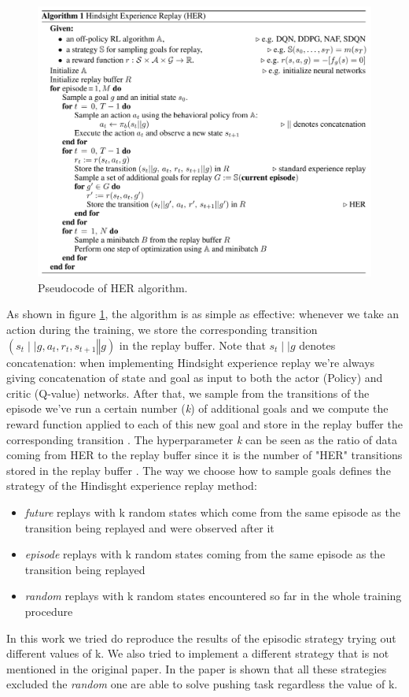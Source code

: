 \documentclass[a4paper]{report}
\begin{document}
\begin{figure}[h!]
\centering
\includegraphics[scale=0.5]{her.png}
\caption{\label{Fig: her} Pseudocode of HER algorithm.}
\end{figure}
As shown in figure \ref{Fig: her}, the algorithm is as simple as effective: whenever we take an action during the training, we store the corresponding transition $(s_t \mid\mid g , a_t, r_t, s_{t+1}\mathbin\Vert g)$ in the replay buffer. Note that $s_t \mid \mid g$ denotes concatenation: when implementing Hindsight experience replay we're always giving concatenation of state and goal as input to both the actor (Policy) and critic (Q-value) networks. 
 After that, we sample from the transitions of the episode we've run a certain number (\textit{k}) of additional goals and we compute the reward function applied to each of this new goal and store in the replay buffer the corresponding transition . The hyperparameter \textit{k} can be seen as the ratio of data coming from HER to the replay buffer since it is the number of "HER" transitions stored in the replay buffer . The way we choose how to sample goals defines the strategy of the Hindisght experience replay method:
\begin{itemize}
\item \textit{future}  replays with k random states which come from the same episode as the transition being replayed and were observed after it
\item \textit{episode}  replays with k random states coming from the same episode as the transition being replayed
\item \textit{random}  replays with k random states encountered so far in the whole training procedure
\end{itemize}
In this work we tried do reproduce the results of the episodic strategy trying out different values of k. We also tried to implement a different strategy that is not mentioned in the original paper. In the paper is shown that all these strategies excluded the \textit{random} one are able to solve pushing task regardless the value of k.
\end{document}
